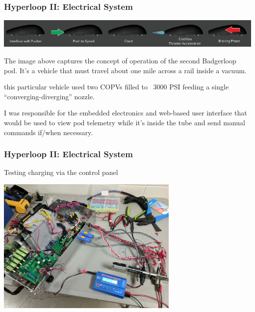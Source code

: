 \documentclass{beamer}
\begin{document}



\begin{frame}
\frametitle{Hyperloop II: Electrical System}
\begin{center}
    \includegraphics[width=\linewidth]{assets/badgerloop_2/conops}
\end{center}
    The image above captures the concept of operation of the second Badgerloop
    pod. It's a vehicle that must travel about one mile across a rail inside
    a vacuum.
    \break

    this particular vehicle used two COPVs filled to ~3000 PSI feeding a single
    ``converging-diverging'' nozzle.
    \break

    I was responsible for the embedded electronics and web-based user interface
    that would be used to view pod telemetry while it's inside the tube and
    send manual commands if/when necessary.
\end{frame}

\begin{frame}
\frametitle{Hyperloop II: Electrical System}
    Testing charging via the control panel
\begin{center}
    \includegraphics[width=3.5in]{assets/electrical_system/charging_test}
\end{center}
\end{frame}
\end{document}
